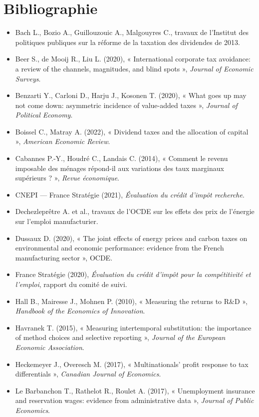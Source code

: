 \chapter*{Bibliographie}
\begin{itemize}\small
\item Bach L., Bozio A., Guillouzouic A., Malgouyres C., travaux de l'Institut des politiques publiques sur la réforme de la taxation des dividendes de 2013.
\item Beer S., de Mooij R., Liu L. (2020), « International corporate tax avoidance: a review of the channels, magnitudes, and blind spots », \emph{Journal of Economic Surveys}.
\item Benzarti Y., Carloni D., Harju J., Kosonen T. (2020), « What goes up may not come down: asymmetric incidence of value-added taxes », \emph{Journal of Political Economy}.
\item Boissel C., Matray A. (2022), « Dividend taxes and the allocation of capital », \emph{American Economic Review}.
\item Cabannes P.-Y., Houdré C., Landais C. (2014), « Comment le revenu imposable des ménages répond-il aux variations des taux marginaux supérieurs ? », \emph{Revue économique}.
\item CNEPI — France Stratégie (2021), \emph{Évaluation du crédit d'impôt recherche}.
\item Dechezleprêtre A. et al., travaux de l'OCDE sur les effets des prix de l'énergie sur l'emploi manufacturier.
\item Dussaux D. (2020), « The joint effects of energy prices and carbon taxes on environmental and economic performance: evidence from the French manufacturing sector », OCDE.
\item France Stratégie (2020), \emph{Évaluation du crédit d'impôt pour la compétitivité et l'emploi}, rapport du comité de suivi.
\item Hall B., Mairesse J., Mohnen P. (2010), « Measuring the returns to R\&D », \emph{Handbook of the Economics of Innovation}.
\item Havranek T. (2015), « Measuring intertemporal substitution: the importance of method choices and selective reporting », \emph{Journal of the European Economic Association}.
\item Heckemeyer J., Overesch M. (2017), « Multinationals' profit response to tax differentials », \emph{Canadian Journal of Economics}.
\item Le Barbanchon T., Rathelot R., Roulet A. (2017), « Unemployment insurance and reservation wages: evidence from administrative data », \emph{Journal of Public Economics}.

\end{itemize}
